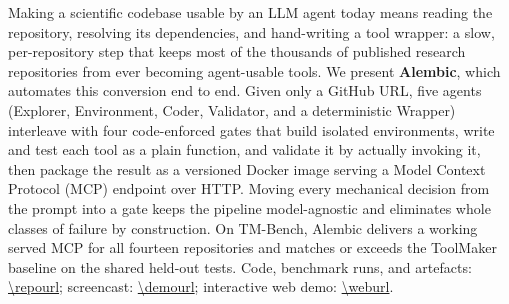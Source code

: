 Making a scientific codebase usable by an LLM agent today means reading the
repository, resolving its dependencies, and hand-writing a tool wrapper: a
slow, per-repository step that keeps most of the thousands of published research
repositories from ever becoming agent-usable tools. We present \textbf{Alembic},
which automates this conversion end to end. Given only a GitHub URL, five agents
(Explorer, Environment, Coder, Validator, and a deterministic Wrapper)
interleave with four code-enforced gates that build isolated environments, write
and test each tool as a plain function, and validate it by actually invoking it,
then package the result as a versioned Docker image serving a Model Context
Protocol (MCP) endpoint over HTTP. Moving every mechanical decision from the
prompt into a gate keeps the pipeline model-agnostic and eliminates whole classes
of failure by construction. On TM-Bench, Alembic delivers a working served MCP
for all fourteen repositories and matches or exceeds the ToolMaker baseline on
the shared held-out tests. Code, benchmark runs, and artefacts:
\url{\repourl}; screencast: \url{\demourl}; interactive web demo: \url{\weburl}.
